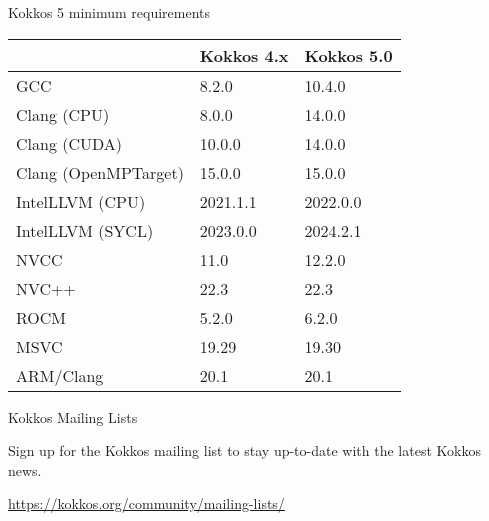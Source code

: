 \begin{frame}[fragile]{Kokkos 5 minimum requirements}

\begin{table}[]
\begin{tabular}{lll}
\multicolumn{1}{r}{} & Kokkos 4.x & Kokkos 5.0 \\ \hline
GCC                  & 8.2.0      & 10.4.0     \\
Clang (CPU)          & 8.0.0      & 14.0.0     \\
Clang (CUDA)         & 10.0.0     & 14.0.0     \\
Clang (OpenMPTarget) & 15.0.0     & 15.0.0     \\
IntelLLVM (CPU)      & 2021.1.1   & 2022.0.0   \\
IntelLLVM (SYCL)     & 2023.0.0   & 2024.2.1   \\
NVCC                 & 11.0       & 12.2.0     \\
NVC++                & 22.3       & 22.3       \\
ROCM                 & 5.2.0      & 6.2.0      \\
MSVC                 & 19.29      & 19.30      \\
ARM/Clang            & 20.1       & 20.1       \\ \hline
\end{tabular}
\end{table}

\end{frame}


\begin{frame}[fragile]{Kokkos Mailing Lists}

\vspace{0.5cm}
\begin{center}
Sign up for the Kokkos mailing list to stay up-to-date with the latest Kokkos news.
\end{center}

\vspace{0.5cm}

\begin{center}
\url{https://kokkos.org/community/mailing-lists/}
\end{center}

\end{frame}


